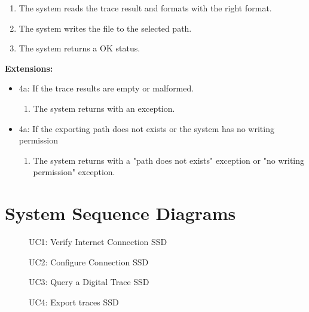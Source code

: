 \documentclass[
	a4paper,					10pt,							twoside,					openright,				notitlepage,			parskip=half,			]{scrreprt}
\begin{document}
\begin{itemize}
\begin{enumerate}
	\item The system reads the trace result and formats with the right format.
	\item The system writes the file to the selected path.
	\item The system returns a OK status.
	\end{enumerate}
\textbf{Extensions:}
	\begin{itemize}
	\item 4a: If the trace results are empty or malformed.
		\begin{enumerate}
			\item The system returns with an exception.
		\end{enumerate}
	\item 4a: If the exporting path does not exists or the system has no writing permission
		\begin{enumerate}
			\item The system returns with a "path does not exists" exception or "no writing permission" exception.
		\end{enumerate}
	\end{itemize}		
\end{itemize}

\section{System Sequence Diagrams}
\label{subsec:api_apistruct_ssd}

\begin{figure}[H] 
\caption{UC1: Verify Internet Connection \gls{SSD}}
\label{fig:ssd-01-checkconnection}
\end{figure}

\begin{figure}[H] 
\caption{UC2: Configure Connection \gls{SSD}}
\label{fig:ssd-02-connectionsettings}
\end{figure}

\begin{figure}[H] 
\caption{UC3: Query a Digital Trace \gls{SSD}}
\label{fig:ssd-03-tracehandling}
\end{figure}

\begin{figure}[H] 
\caption{UC4: Export traces \gls{SSD}}
\label{fig:ssd-04-export}
\end{figure}
\end{document}
